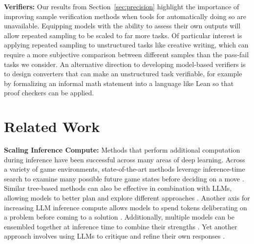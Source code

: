 \documentclass[11pt]{article}
\begin{document}
\noindent \textbf{Verifiers:} Our results from Section~\ref{sec:precision} highlight the importance of improving sample verification methods when tools for automatically doing so are unavailable. Equipping models with the ability to assess their own outputs will allow repeated sampling to be scaled to far more tasks. Of particular interest is applying repeated sampling to unstructured tasks like creative writing, which can require a more subjective comparison between different samples than the pass-fail tasks we consider. An alternative direction to developing model-based verifiers is to design converters that can make an unstructured task verifiable, for example by formalizing an informal math statement into a language like Lean so that proof checkers can be applied.


\section{Related Work}

\textbf{Scaling Inference Compute:} Methods that perform additional computation during inference have been successful across many areas of deep learning. Across a variety of game environments, state-of-the-art methods leverage inference-time search to examine many possible future game states before deciding on a move \cite{deepblue, silver2017mastering, pluribus}. Similar tree-based methods can also be effective in combination with LLMs, allowing models to better plan and explore different approaches \cite{yao2023treethoughtsdeliberateproblem, Besta_2024, tian2024selfimprovementllmsimaginationsearching, Trinh2024alphageometry}. Another axis for increasing LLM inference compute allows models to spend tokens deliberating on a problem before coming to a solution \cite{yao2022reactsynergizingreasoningacting, wei2023chainofthought, zelikman2024quietstarlanguagemodelsteach}. Additionally, multiple models can be ensembled together at inference time to combine their strengths \cite{wang2024mixtureofagentsenhanceslargelanguage, chen2024llmcallsneedscaling, ong2024routellmlearningroutellms, wan2024knowledgefusionlargelanguage, jiang2023llmblenderensemblinglargelanguage}. Yet another approach involves using LLMs to critique and refine their own responses \cite{madaan2023selfrefineiterativerefinementselffeedback, bai2022constitutional}.

\;
\end{document}
